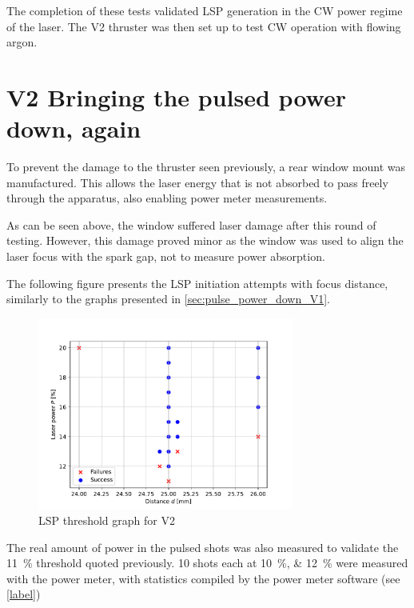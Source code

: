                 The completion of these tests validated LSP generation in the CW power regime of the laser. The V2 thruster was then set up to test CW operation with flowing argon.
            
            \section{V2 Bringing the pulsed power down, again}
            
                To prevent the damage to the thruster seen previously, a rear window mount was manufactured. This allows the laser energy that is not absorbed to pass freely through the apparatus, also enabling power meter measurements. 
                
    
                As can be seen above, the window suffered laser damage after this round of testing. However, this damage proved minor as the window was used to align the laser focus with the spark gap, not to measure power absorption.
                
                The following figure presents the LSP initiation attempts with focus distance, similarly to the graphs presented in \autoref{sec:pulse_power_down_V1}.
    
                \begin{figure}[!ht]
                    \centering
                    \includegraphics[width=0.75\textwidth]{assets/4 experiments/V2_focus_threshold.pdf}
                    \caption{LSP threshold graph for V2}
                \end{figure}
    
                The real amount of power in the pulsed shots was also measured to validate the \qty{11}{\%} threshold quoted previously. 10 shots each at \qtylist{10; 12}{\%} were measured with the power meter, with statistics compiled by the power meter software (see \autoref{label})
    
